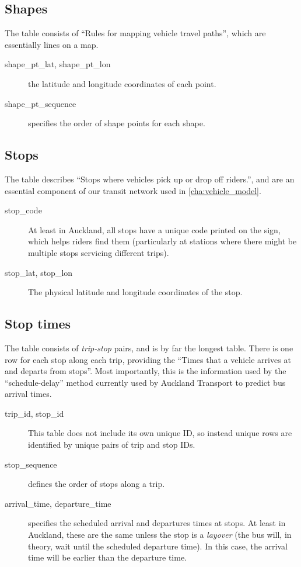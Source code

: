 \subsection*{Shapes}
The  table consists of ``Rules for mapping vehicle travel paths'', which are essentially lines on a map.
\begin{description}
  \item[shape\_pt\_lat, shape\_pt\_lon] the latitude and longitude coordinates of each point.
  \item[shape\_pt\_sequence] specifies the order of shape points for each shape.
\end{description}

\subsection*{Stops}
The  table describes ``Stops where vehicles pick up or drop off riders.'', and are an essential component of our transit network used in \cref{cha:vehicle_model}.
\begin{description}
  \item[stop\_code] At least in Auckland, all stops have a unique code printed on the sign, which helps riders find them (particularly at stations where there might be multiple stops servicing different trips).
  \item[stop\_lat, stop\_lon] The physical latitude and longitude coordinates of the stop.
\end{description}

\subsection*{Stop times}
The  table consists of \emph{trip-stop} pairs, and is by far the longest table. There is one row for each stop along each trip, providing the ``Times that a vehicle arrives at and departs from stops''. Most importantly, this is the information used by the ``schedule-delay'' method currently used by Auckland Transport to predict bus arrival times.
\begin{description}
  \item[trip\_id, stop\_id] This table does not include its own unique ID, so instead unique rows are identified by unique pairs of trip and stop IDs.
  \item[stop\_sequence] defines the order of stops along a trip.
  \item[arrival\_time, departure\_time] specifies the scheduled arrival and departures times at stops. At least in Auckland, these are the same unless the stop is a \emph{layover} (the bus will, in theory, wait until the scheduled departure time). In this case, the arrival time will be earlier than the departure time.
\end{description}
